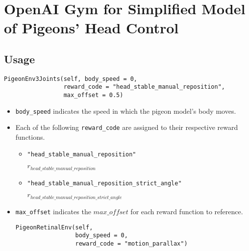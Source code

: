 \section{OpenAI Gym for Simplified Model of Pigeons' Head Control}


\subsection{Usage}
\begin{lstlisting}
PigeonEnv3Joints(self, body_speed = 0,
                 reward_code = "head_stable_manual_reposition",
                 max_offset = 0.5)
\end{lstlisting}
\begin{itemize}
    \item \lstinline|body_speed| indicates the speed in which the pigeon model's body moves.

    \item Each of the following \lstinline|reward_code| are assigned to their respective reward functions.
        \begin{itemize}
          \item \lstinline|"head_stable_manual_reposition"|
              \begin{description}
                  $r_{head\_stable\_manual\_reposition}$
              \end{description}
          \item \lstinline|"head_stable_manual_reposition_strict_angle"|
              \begin{description}
                  $r_{head\_stable\_manual\_reposition\_strict\_angle}$
              \end{description}
        \end{itemize}
    \item \lstinline|max_offset| indicates the $max\_offset$ for each reward function to reference.

\begin{lstlisting}
PigeonRetinalEnv(self,
                 body_speed = 0,
                 reward_code = "motion_parallax")
\end{lstlisting}


\end{itemize}
